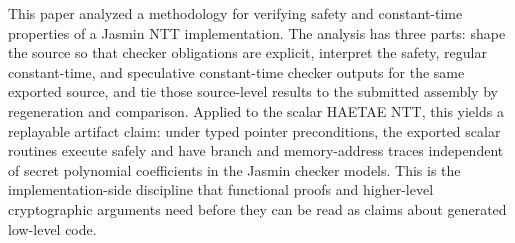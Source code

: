 \documentclass[10pt,twocolumn]{article}
\newcommand{\haetae}{HAETAE}
\newcommand{\jasmin}{Jasmin}
\newcommand{\ct}{constant-time}
\begin{document}
This paper analyzed a methodology for verifying safety and constant-time
properties of a \jasmin{} NTT implementation.  The analysis has three parts:
shape the source so that checker obligations are explicit, interpret the
safety, regular \ct{}, and speculative \ct{} checker outputs for the same
exported source, and
tie those source-level results to the submitted assembly by regeneration and
comparison.  Applied to the scalar \haetae{} NTT, this yields a replayable
artifact claim: under typed pointer preconditions, the exported scalar routines
execute safely and have branch and memory-address traces independent of secret
polynomial coefficients in the \jasmin{} checker models.  This is the
implementation-side discipline that functional proofs and higher-level
cryptographic arguments need before they can be read as claims about generated
low-level code.



\end{document}
